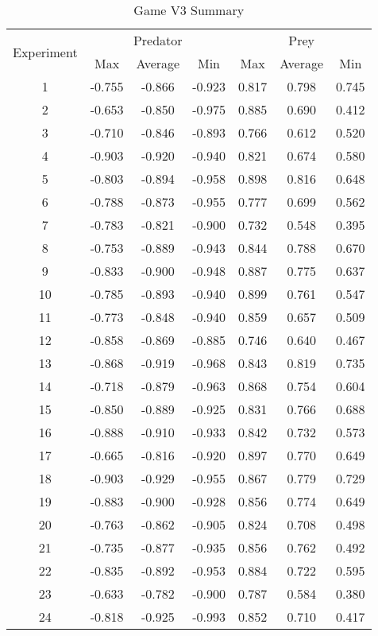 \begin{table}
  \centering
  \begin{tabular}{|c|c|c|c|c|c|c|}
    \hline
    \multirow{2}{*}{Experiment} & \multicolumn{3}{|c|}{Predator} & \multicolumn{3}{|c|}{Prey} \\\cline{2-7}
    & Max & Average & Min & Max & Average & Min\\
    \hline
    1 & -0.755 & -0.866 & -0.923 & 0.817 & 0.798 & 0.745 \\
2 & -0.653 & -0.850 & -0.975 & 0.885 & 0.690 & 0.412 \\
3 & -0.710 & -0.846 & -0.893 & 0.766 & 0.612 & 0.520 \\
4 & -0.903 & -0.920 & -0.940 & 0.821 & 0.674 & 0.580 \\
5 & -0.803 & -0.894 & -0.958 & 0.898 & 0.816 & 0.648 \\
6 & -0.788 & -0.873 & -0.955 & 0.777 & 0.699 & 0.562 \\
7 & -0.783 & -0.821 & -0.900 & 0.732 & 0.548 & 0.395 \\
8 & -0.753 & -0.889 & -0.943 & 0.844 & 0.788 & 0.670 \\
9 & -0.833 & -0.900 & -0.948 & 0.887 & 0.775 & 0.637 \\
10 & -0.785 & -0.893 & -0.940 & 0.899 & 0.761 & 0.547 \\
11 & -0.773 & -0.848 & -0.940 & 0.859 & 0.657 & 0.509 \\
12 & -0.858 & -0.869 & -0.885 & 0.746 & 0.640 & 0.467 \\
13 & -0.868 & -0.919 & -0.968 & 0.843 & 0.819 & 0.735 \\
14 & -0.718 & -0.879 & -0.963 & 0.868 & 0.754 & 0.604 \\
15 & -0.850 & -0.889 & -0.925 & 0.831 & 0.766 & 0.688 \\
16 & -0.888 & -0.910 & -0.933 & 0.842 & 0.732 & 0.573 \\
17 & -0.665 & -0.816 & -0.920 & 0.897 & 0.770 & 0.649 \\
18 & -0.903 & -0.929 & -0.955 & 0.867 & 0.779 & 0.729 \\
19 & -0.883 & -0.900 & -0.928 & 0.856 & 0.774 & 0.649 \\
20 & -0.763 & -0.862 & -0.905 & 0.824 & 0.708 & 0.498 \\
21 & -0.735 & -0.877 & -0.935 & 0.856 & 0.762 & 0.492 \\
22 & -0.835 & -0.892 & -0.953 & 0.884 & 0.722 & 0.595 \\
23 & -0.633 & -0.782 & -0.900 & 0.787 & 0.584 & 0.380 \\
24 & -0.818 & -0.925 & -0.993 & 0.852 & 0.710 & 0.417 \\

    \hline
  \end{tabular}
  \caption{Game V3 Summary}
  \label{tab:v3-summary}
\end{table}